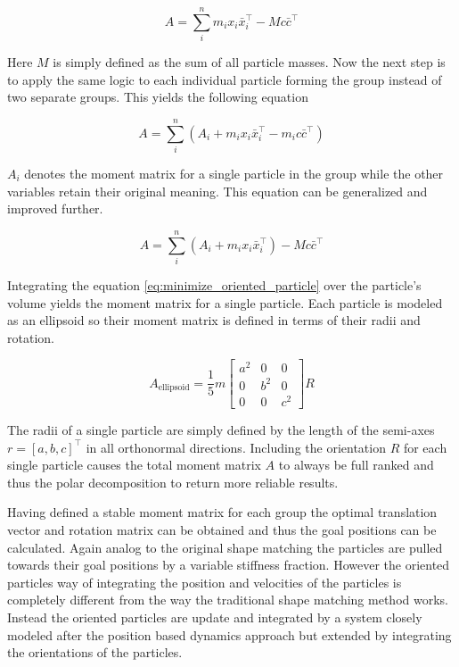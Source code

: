 \begin{equation}
A = \sum\limits_i^n m_ix_i\bar{x}_i^\top - Mc\bar{c}^\top
\label{eq:minimize_oriented_particle}
\end{equation}

Here $M$ is simply defined as the sum of all particle masses. Now the next step is to apply the same logic to each individual particle forming the group instead of two separate groups. This yields the following equation

\begin{equation}
A = \sum\limits_i^n (A_i + m_ix_i\bar{x}_i^\top-m_ic\bar{c}^\top)
\end{equation}

$A_i$ denotes the moment matrix for a single particle in the group while the other variables retain their original meaning. This equation can be generalized and improved further.

\begin{equation}
A = \sum\limits_i^n (A_i + m_ix_i\bar{x}_i^\top) - Mc\bar{c}^\top
\end{equation}

Integrating the equation \ref{eq:minimize_oriented_particle} over the particle's volume yields the moment matrix for a single particle. Each particle is modeled as an ellipsoid so their moment matrix is defined in terms of their radii and rotation.

\begin{equation}
A_{\text{ellipsoid}} = \frac{1}{5}m \begin{bmatrix} a^2 & 0 & 0 \\ 0 & b^2 & 0 \\ 0 & 0 & c^2  \end{bmatrix} R
\end{equation}

The radii of a single particle are simply defined by the length of the semi-axes $r = [a,b,c]^\top$ in all orthonormal directions. Including the orientation $R$ for each single particle causes the total moment matrix $A$ to always be full ranked and thus the polar decomposition to return more reliable results.

Having defined a stable moment matrix for each group the optimal translation vector and rotation matrix can be obtained and thus the goal positions can be calculated. Again analog to the original shape matching the particles are pulled towards their goal positions by a variable stiffness fraction. However the oriented particles way of integrating the position and velocities of the particles is completely different from the way the traditional shape matching method works. Instead the oriented particles are update and integrated by a system closely modeled after the position based dynamics approach but extended by integrating the orientations of the particles.


